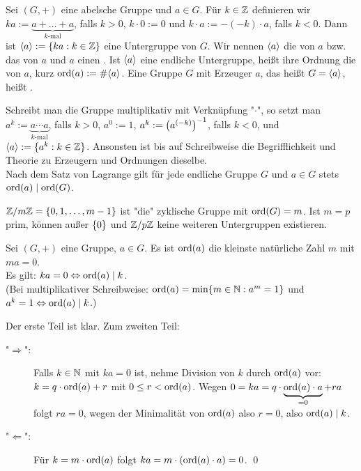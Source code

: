 \begin{defn}
	Sei $(G,+)$ eine abelsche Gruppe und $a \in G$. Für $k \in \ZZ$ definieren wir $ka := \underbrace{a + \dots + a}_{k\text{-mal}}$, falls $k > 0$, $k \cdot 0 := 0$ und $k \cdot a := -(-k)\cdot a$, falls $k < 0$. Dann ist $\sprod{a} := \{ka : k \in \ZZ\}$ eine Untergruppe von $G$. Wir nennen $\sprod{a}$ die von $a$  bzw. das  von $a$ und $a$ einen . Ist $\sprod{a}$ eine endliche Untergruppe, heißt ihre Ordnung die  von $a$, kurz $\ord(a) := \#\sprod{a}$. Eine Gruppe $G$ mit Erzeuger $a$, das heißt $G = \sprod{a}$, heißt .
\end{defn}

Schreibt man die Gruppe multiplikativ mit Verknüpfung "$\cdot$", so setzt man $a^k := \underbrace{a \cdots a}_{k\text{-mal}}$, falls $k > 0$, $a^0 := 1$, $a^k := \enbrace*{a^{(-k)}}^{-1}$, falls $k < 0$, und $\sprod{a} := \{a^k : k \in \ZZ\}$. Ansonsten ist bis auf Schreibweise die Begrifflichkeit und Theorie zu Erzeugern und Ordnungen dieselbe. \\
Nach dem Satz von Lagrange gilt für jede endliche Gruppe $G$ und $a \in G$ stets $\ord(a) \mid \ord(G)$.

\begin{bsp}
	$\ZZ/m\ZZ = \{0,1, \dots, m-1\}$ ist "die" zyklische Gruppe mit $\ord(G) = m$. Ist $m = p$ prim, können außer $\setnull$ und $\ZZ/p\ZZ$ keine weiteren Untergruppen existieren.
\end{bsp}

\begin{lemma}
\label{lemma_1.1.3.6}
	Sei $(G,+)$ eine Gruppe, $a \in G$. Es ist $\ord(a)$ die kleinste natürliche Zahl $m$ mit $ma = 0$. \\
	Es gilt: $ka = 0 \Leftrightarrow \ord(a) \mid k$. \\
	(Bei multiplikativer Schreibweise: $\ord(a) = \min\{m \in \NN : a^m = 1\}$ und $a^k = 1 \Leftrightarrow \ord(a) \mid k$.)
\end{lemma}

	Der erste Teil ist klar. Zum zweiten Teil:
	\begin{description}
		\item["$\Rightarrow$":] Falls $k \in \NN$ mit $ka = 0$ ist, nehme Division von $k$ durch $\ord(a)$ vor: $k = q \cdot \ord(a) + r$ mit $0 \leq r < \ord(a)$. Wegen $0 = ka = q \cdot \underbrace{\ord(a) \cdot a}_{=0} + ra$ folgt $ra = 0$, wegen der Minimalität von $\ord(a)$ also $r=0$, also $\ord(a) \mid k$.
		\item["$\Leftarrow$":] Für $k = m \cdot \ord(a)$ folgt $ka = m \cdot (\ord(a) \cdot a) = 0$. \qed
	\end{description}
	
